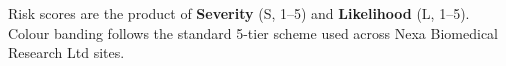 
\newpage


\vspace{4pt}

{\small
Risk scores are the product of \textbf{Severity} (S, 1--5) and \textbf{Likelihood}
(L, 1--5). Colour banding follows the standard 5-tier scheme used across
Nexa Biomedical Research Ltd sites.
}

\vspace{8pt}

